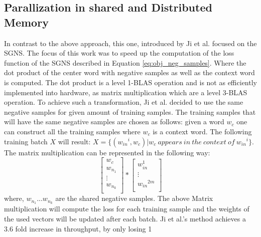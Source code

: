 \subsection{Parallization in shared and Distributed Memory}
In contrast to the above approach, this one, introduced by Ji et al. \citep{intel} focused on the SGNS. The focus of this work was to speed up the computation of the loss function of the SGNS described in Equation \ref{eq:obj_neg_samples}. Where the dot product of the center word  with negative samples as well as the context word is computed. The dot product is a level 1-BLAS operation and is not as efficiently implemented into hardware, as matrix multiplication which are a level 3-BLAS operation.  To achieve such a transformation, Ji et al. decided to use the same negative samples for given amount of training samples. The training samples that will have the same negative samples are chosen as follows: given a word $w_c$ one can construct all the training samples where $w_c$ is a context word. The following training batch $X$ will result: $X = \{({w_{in}}^i, w_c) | w_c~appears~in~the~context~of~{w_{in}}^i\}$. The matrix multiplication can be represented in the following way:
\[
\begin{bmatrix}
w_c \\
w_{n_1} \\
\vdots \\
w_{n_k}\\
\end{bmatrix}
*
\begin{bmatrix}
w_{in}^1\\
\vdots\\
{w_{in}}^{2m}\\
\end{bmatrix}
\]
where, $w_{n_1}...w_{n_k}$ are the shared negative samples. The above Matrix multiplication will compute the loss for each training sample and the weights of the used vectors will be updated after each batch. Ji et al.'s method achieves a 3.6 fold increase in throughput, by only losing 1\ %


